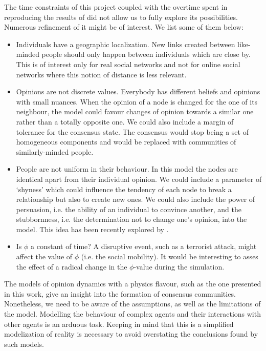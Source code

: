 \documentclass[11pt]{article}
\begin{document}
The time constraints of this project coupled with the overtime spent in reproducing the results of \cite{Holme2006} did not allow us to fully explore its possibilities. Numerous refinement of it might be of interest. We list some of them below:
\begin{itemize}
    \item Individuals have a geographic localization. New links created between like-minded people should only happen between individuals which are close by. This is of interest only for real social networks and not for online social networks where this notion of distance is less relevant.
    \item Opinions are not discrete values. Everybody has different beliefs and opinions with small nuances. When the opinion of a node is changed for the one of its neighbour, the model could favour changes of opinion towards a similar one rather than a totally opposite one. We could also include a margin of tolerance for the consensus state. The consensus would stop being a set of homogeneous components and would be replaced with communities of similarly-minded people. 
    \item People are not uniform in their behaviour. In this model the nodes are identical apart from their individual opinion. We could include a parameter of `shyness' which could influence the tendency of each node to break a relationship but also to create new ones. We could also include the power of persuasion, i.e. the ability of an individual to convince another, and the stubbornness, i.e. the determination not to change one's opinion, into the model. This idea has been recently explored by \citet{Perez-Llanos2018}.
    \item Is $\phi$ a constant of time? A disruptive event, such as a terrorist attack, might affect the value of $\phi$ (i.e. the social mobility). It would be interesting to asses the effect of a radical change in the $\phi$-value during the simulation.
\end{itemize}

The models of opinion dynamics with a physics flavour, such as the one presented in this work, give an insight into the formation of consensus communities. Nonetheless, we need to be aware of the assumptions, as well as the limitations of the model. Modelling the behaviour of complex agents and their interactions with other agents is an arduous task. Keeping in mind that this is a simplified modelization of reality is necessary to avoid overstating the conclusions found by such models.



\end{document}
